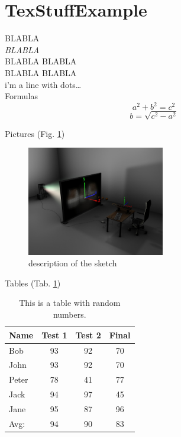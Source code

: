 \section*{TexStuffExample}



BLABLA\\
\emph{BLABLA}\\
BLABLA
BLABLA\\
BLABLA
BLABLA
\\
i'm a line with dots\ldots
\\





Formulas
\[ a^2 + b^2 = c^2\]
\[ b = \sqrt{c^2 - a^2} \]

Pictures (Fig. \ref{fig:egPic})\\
\begin{figure}[htp]
\begin{center}
\includegraphics[width=6cm]{Pic/exampleimage.jpg}
\caption{description of the sketch}
\label{fig:egPic}
\end{center}
\end{figure}





Tables (Tab. \ref{tab:mytable})\\
\begin{table}[htbp]
\begin{center}
\begin{tabular}{|l||c|c|c|} \hline
Name & Test 1 & Test 2 & Final \\ \hline \hline
Bob & 93 & 92 & 70 \\ \hline
John & 93 & 92 & 70 \\ \hline
Peter & 78 & 41 & 77 \\ \hline
Jack & 94 & 97 & 45 \\ \hline
Jane & 95 & 87 & 96 \\ \hline \hline
Avg: & 94 & 90 & 83 \\ \hline
\end{tabular}
\caption{\label{tab:mytable}This is a table with random numbers.}
\end{center}
\end{table}


